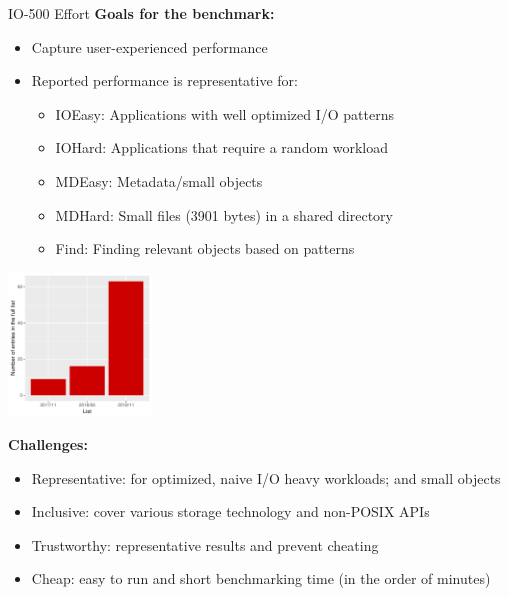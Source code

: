 \documentclass[portrait,a0paper,fontscale=0.4]{baposter}
\newcommand{\compresslist}{%
\setlength{\itemsep}{1pt}%
\setlength{\parskip}{0pt}%
\setlength{\parsep}{0pt}%
}
\begin{document}
\begin{poster}
\begin{posterbox}[name=io500,column=1,span=2]{IO-500 Effort}
\textbf{Goals for the benchmark:}

\vspace*{-2em}
\begin{minipage}{10.5cm}
\begin{itemize} \compresslist
\item Capture user-experienced performance %
\item Reported performance is representative for:
\begin{itemize} \compresslist
\item IOEasy: Applications with well optimized I/O patterns
\item IOHard: Applications that require a random workload
\item MDEasy: Metadata/small objects
\item MDHard: Small files (3901 bytes) in a shared directory
\item Find: Finding relevant objects based on patterns
\end{itemize}
\end{itemize}
\end{minipage}
\qquad
\begin{minipage}{4cm}
  \includegraphics[width=3.8cm]{io-500-history.pdf}
\end{minipage}

\vspace*{-1.5em}


\textbf{Challenges:}
\vspace*{-1em}
\begin{itemize} \compresslist
\item Representative: for optimized, naive I/O heavy workloads; and small objects
\item Inclusive: cover various storage technology and non-POSIX APIs
\item Trustworthy: representative results and prevent cheating
\item Cheap: easy to run and short benchmarking time (in the order of minutes)
\end{itemize}


\end{posterbox}
\end{poster}
\end{document}
